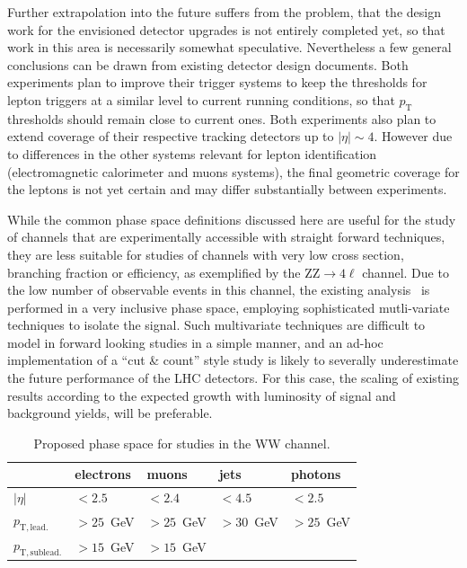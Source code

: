 Further extrapolation into the future suffers from the problem, that the design work for the envisioned detector upgrades is not entirely completed yet, so that work in this area is necessarily somewhat speculative. Nevertheless a few general conclusions can be drawn from existing detector design documents. Both experiments plan to improve their trigger systems to keep the thresholds for lepton triggers at a similar level to current running conditions, so that $p_{\mathrm{T}}$ thresholds should remain close to current ones. Both experiments also plan to extend coverage of their respective tracking detectors up to $|\eta|\sim 4$. However due to differences in the other systems relevant for lepton identification (electromagnetic calorimeter and muons systems), the final geometric coverage for the leptons is not yet certain and may differ substantially between experiments.

While the common phase space definitions discussed here are useful for the study of channels that are experimentally accessible with straight forward techniques, they are less suitable for studies of channels with very low cross section, branching fraction or efficiency, as exemplified by the ZZ$\rightarrow 4\ell$ channel. Due to the low number of observable events in this channel, the existing analysis~\cite{CMS-PAS-SMP-17-006} is performed in a very inclusive phase space, employing sophisticated mutli-variate techniques to isolate the signal. Such multivariate techniques are difficult to model in forward looking studies in a simple manner, and an ad-hoc implementation of a  ``cut \& count'' style study is likely to severally underestimate the future performance of the LHC detectors. For this case, the scaling of existing results according to the expected growth with luminosity of signal and background yields, will be preferable.

\begin{table}[htb]
\centering
\begin{tabular}{|l|l|l|l|l|}
    \hline
             & electrons & muons & jets & photons \\
    \hline
    $|\eta|$ & $<2.5$  & $<2.4$ & $<4.5$ & $<2.5$ \\
    $p_\mathrm{T,lead.}$ & $>25$~GeV & $>25$~GeV &$>30$~GeV &$>25$~GeV\\
    $p_\mathrm{T,sublead.}$ & $>15$~GeV & $>15$~GeV &&\\                            
    \hline
  \end{tabular}  

\caption{\label{tab:wg2:phasespace} Proposed phase space for studies in the WW channel.}
\end{table}

